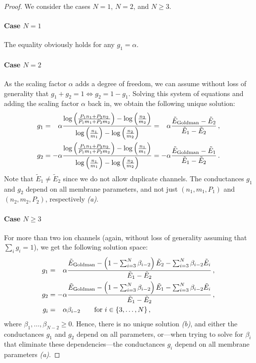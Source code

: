 \begin{proof}
We consider the cases $N = 1$, $N = 2$, and $N \geq 3$.

\paragraph{Case $N = 1$}
The equality obviously holds for any $g_1 = \alpha$.

\paragraph{Case $N = 2$}
As the scaling factor $\alpha$ adds a degree of freedom, we can assume without loss of generality that $g_1 + g_2 = 1 \Leftrightarrow g_2 = 1 - g_1$.
Solving this system of equations and adding the scaling factor $\alpha$ back in, we obtain the following unique solution:
\begin{align*}
	g_1 &= \hphantom{-} \alpha \frac{ \log \left( \frac{P_1 n_1 + P_2 n_2}{P_1 m_1 + P_2 m_2} \right)  - \log \left( \frac{n_2}{m_2} \right)}{\log \left( \frac{n_1}{m_1} \right) - \log \left( \frac{n_2}{m_2} \right)}
	     = \hphantom{-}\alpha \frac{\tilde E_\mathrm{Goldman} -\tilde E_2}{\tilde E_1 - \tilde E_2} \,, \\
	g_2 &= -\alpha \frac{ \log \left( \frac{P_1 n_1 + P_2 n_2}{P_1 m_1 + P_2 m_2} \right)  - \log \left( \frac{n_1}{m_1} \right)}{\log \left( \frac{n_1}{m_1} \right) - \log \left( \frac{n_2}{m_2} \right)}
	     = -\alpha \frac{\tilde E_\mathrm{Goldman} - \tilde E_1}{\tilde E_1 - \tilde E_2} \,.
\end{align*}
\vspace{-0.05em}Note that $\tilde E_1 \neq \tilde E_2$ since we do not allow duplicate channels.
The conductances $g_1$ and $g_2$ depend on all membrane parameters, and not just $(n_1, m_1, P_1)$ and $(n_2, m_2, P_2)$, respectively \emph{(a)}.

\paragraph{Case $N \geq 3$}
For more than two ion channels (again, without loss of generality assuming that $\sum_i g_i = 1$), we get the following solution space:
\begin{align*}
	g_1 &= \hphantom{-}\alpha \frac{\tilde E_\mathrm{Goldman} - \left(1 - \sum_{i = 3}^N \beta_{i - 2} \right) \tilde E_2  - \sum_{i = 3}^N \beta_{i - 2} \tilde E_i}{\tilde E_1 - \tilde E_2} \,, \\
	g_2 &= -\alpha \frac{\tilde E_\mathrm{Goldman}  - \left(1 - \sum_{i = 3}^N \beta_{i - 2} \right) \tilde E_1  - \sum_{i = 3}^N \beta_{i - 2} \tilde E_i}{\tilde E_1 - \tilde E_2} \,, \\
	g_i &= \hphantom{-}\alpha \beta_{i - 2} \quad \quad \text{for } i \in \{3, \ldots, N \} \,,
\end{align*}
where $\beta_1, \ldots, \beta_{N - 2} \geq 0$. Hence, there is no unique solution \emph{(b)}, and either the conductances $g_1$ and $g_2$ depend on all parameters, or---when trying to solve for $\beta_i$ that eliminate these dependencies---the conductances $g_i$ depend on all membrane parameters  \emph{(a)}.
\end{proof}
